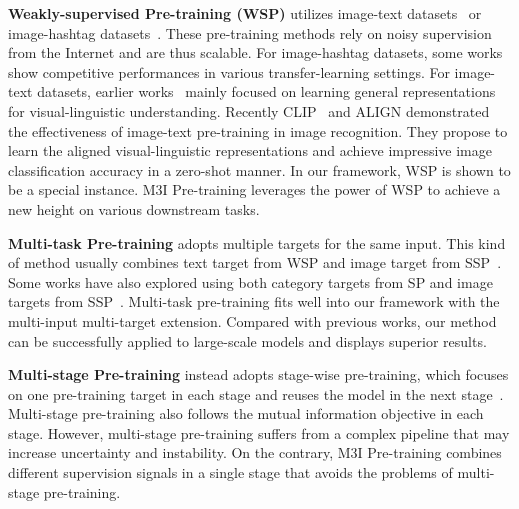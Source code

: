\documentclass[10pt,twocolumn,letterpaper]{article}
\def\name{M3I Pre-training}
\begin{document}
\vspace{0.5em}\noindent\textbf{Weakly-supervised Pre-training (WSP)} utilizes image-text datasets~\cite{sharma2018conceptual,changpinyo2021conceptual,thomee2016yfcc100m,schuhmann2021laion} or image-hashtag datasets~\cite{mahajan2018exploring,veit2018separating,singh2022revisiting}. These pre-training methods rely on noisy supervision from the Internet and are thus scalable.
For image-hashtag datasets, some works~\cite{mahajan2018exploring,singh2022revisiting} show competitive performances in various transfer-learning settings.
For image-text datasets, earlier works~\cite{Su2020VL-BERT:,lu2019vilbert,chen2020uniter,sun2019videobert,sun2019learning,tan2019lxmert,li2020unicoder,alberti2019fusion,li2019visualbert} mainly focused on learning general representations for visual-linguistic understanding. Recently CLIP~\cite{radford2021learning} and ALIGN\cite{jia2021scaling} demonstrated the effectiveness of image-text pre-training in image recognition. They propose to learn the aligned visual-linguistic representations and achieve impressive image classification accuracy in a zero-shot manner. In our framework, WSP is shown to be a special instance. \name{} leverages the power of WSP to achieve a new height on various downstream tasks.

\vspace{0.5em}\noindent\textbf{Multi-task Pre-training} adopts multiple targets for the same input. This kind of method usually combines text target from WSP and image target from SSP~\cite{yu2022coca,singh2022flava,dong2022maskclip,mu2022slip}. Some works have also explored using both category targets from SP and image targets from SSP~\cite{khosla2020supervised,liang2022supmae}. 
Multi-task pre-training fits well into our framework with the multi-input multi-target extension. Compared with previous works, our method can be successfully applied to large-scale models and displays superior results.

\vspace{0.5em}\noindent\textbf{Multi-stage Pre-training} instead adopts stage-wise pre-training, which focuses on one pre-training target in each stage and reuses the model in the next stage~\cite{peng2022beit,wang2022image,wei2022contrastive}. Multi-stage pre-training also follows the mutual information objective in each stage. However, multi-stage pre-training suffers from a complex pipeline that may increase uncertainty and instability. On the contrary, \name{} combines different supervision signals in a single stage that avoids the problems of multi-stage pre-training.
\end{document}
